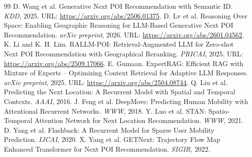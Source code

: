 \documentclass[10pt,twocolumn,fontset=none]{ctexart}
\begin{document}
\begin{thebibliography}{99}
\small
{} D. Wang et al. Generative Next POI Recommendation with Semantic ID. \emph{KDD}, 2025. URL: \url{https://arxiv.org/abs/2506.01375}.
 D. Lv et al. Reasoning Over Space: Enabling Geographic Reasoning for LLM-Based Generative Next POI Recommendation. \emph{arXiv preprint}, 2026. URL: \url{https://arxiv.org/abs/2601.04562}.
 K. Li and K. H. Lim. RALLM-POI: Retrieval-Augmented LLM for Zero-shot Next POI Recommendation with Geographical Reranking. \emph{PRICAI}, 2025. URL: \url{https://arxiv.org/abs/2509.17066}.
 E. Gumaan. ExpertRAG: Efficient RAG with Mixture of Experts -- Optimizing Context Retrieval for Adaptive LLM Responses. \emph{arXiv preprint}, 2025. URL: \url{https://arxiv.org/abs/2504.08744}.
 Q. Liu et al. Predicting the Next Location: A Recurrent Model with Spatial and Temporal Contexts. \emph{AAAI}, 2016.
 J. Feng et al. DeepMove: Predicting Human Mobility with Attentional Recurrent Networks. \emph{WWW}, 2018.
 Y. Luo et al. STAN: Spatio-Temporal Attention Network for Next Location Recommendation. \emph{WWW}, 2021.
 D. Yang et al. Flashback: A Recurrent Model for Sparse User Mobility Prediction. \emph{IJCAI}, 2020.
 X. Yang et al. GETNext: Trajectory Flow Map Enhanced Transformer for Next POI Recommendation. \emph{SIGIR}, 2022.
\end{thebibliography}
\end{document}
